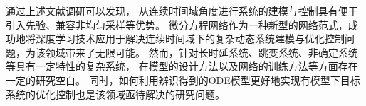 通过上述文献调研可以发现，
从连续时间域角度进行系统的建模与控制具有便于引入先验、兼容非均匀采样等优势。
微分方程网络作为一种新型的网络范式，成功地将深度学习技术应用于解决连续时间域下的复杂动态系统建模与优化控制问题，为该领域带来了无限可能。
然而，针对长时延系统、跳变系统、非确定系统等具有一定特性的复杂系统，
在模型的设计方法以及网络的训练方法等方面存在一定的研究空白。
同时，如何利用辨识得到的ODE模型更好地实现有模型下目标系统的优化控制也是该领域亟待解决的研究问题。
